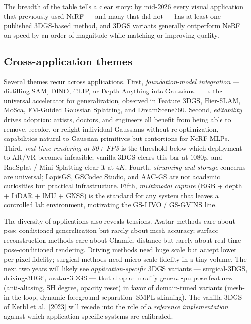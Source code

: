 \documentclass{article}
\begin{document}
The breadth of the table tells a clear story: by mid-2026 every visual application that previously used NeRF --- and many that did not --- has at least one published 3DGS-based method, and 3DGS variants generally outperform NeRF on speed by an order of magnitude while matching or improving quality.

\subsection{Cross-application themes}\label{cross-application-themes}

Several themes recur across applications. First, \emph{foundation-model integration} --- distilling SAM, DINO, CLIP, or Depth Anything into Gaussians --- is the universal accelerator for generalization, observed in Feature 3DGS, Hier-SLAM, MoSca, FM-Guided Gaussian Splatting, and DreamScene360. Second, \emph{editability} drives adoption: artists, doctors, and engineers all benefit from being able to remove, recolor, or relight individual Gaussians without re-optimization, capabilities natural to Gaussian primitives but contortions for NeRF MLPs. Third, \emph{real-time rendering at 30+ FPS} is the threshold below which deployment to AR/VR becomes infeasible; vanilla 3DGS clears this bar at \(1080p\), and RadSplat / Mini-Splatting clear it at \(4K\). Fourth, \emph{streaming and storage} concerns are universal; LapisGS, GSCodec Studio, and AAC-GS are not academic curiosities but practical infrastructure. Fifth, \emph{multimodal capture} (RGB + depth + LiDAR + IMU + GNSS) is the standard for any system that leaves a controlled lab environment, motivating the GS-LIVO / GS-GVINS line.

The diversity of applications also reveals tensions. Avatar methods care about pose-conditioned generalization but rarely about mesh accuracy; surface reconstruction methods care about Chamfer distance but rarely about real-time pose-conditioned rendering. Driving methods need huge scale but accept lower per-pixel fidelity; surgical methods need micro-scale fidelity in a tiny volume. The next two years will likely see \emph{application-specific} 3DGS variants --- surgical-3DGS, driving-3DGS, avatar-3DGS --- that drop or modify general-purpose features (anti-aliasing, SH degree, opacity reset) in favor of domain-tuned variants (mesh-in-the-loop, dynamic foreground separation, SMPL skinning). The vanilla 3DGS of Kerbl et al.~{[}2023{]} will recede into the role of a \emph{reference implementation} against which application-specific systems are calibrated.
\end{document}
